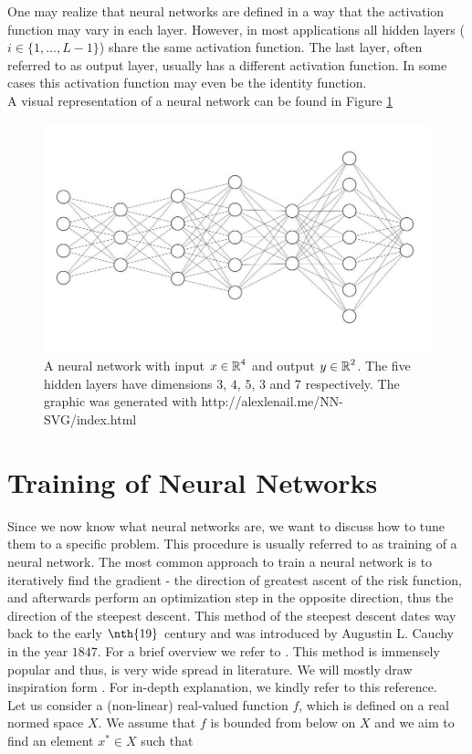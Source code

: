 One may realize that neural networks are defined in a way that the activation function may vary in each layer. However, in most applications all hidden layers ($i \in \{1, \ldots, L-1\}$) share the same activation function. The last layer, often referred to as output layer, usually has a different activation function. In some cases this activation function may even be the identity function.\\
A visual representation of a neural network can be found in Figure \ref{img_nn}


\begin{figure}[H]
\begin{center}
   \begin{minipage}[b]{0.9\linewidth}
      \includegraphics[width=\linewidth]{neural_net}
      \caption{A neural network with input $x\in \operatorname{\mathbb{R}}^4$ and output $y\in\operatorname{\mathbb{R}}^2$. The five hidden layers have dimensions $3$, $4$, $5$, $3$ and $7$ respectively. The graphic was generated with http://alexlenail.me/NN-SVG/index.html}\label{img_nn}
	\end{minipage}
\end{center}
\end{figure}


\section{Training of Neural Networks}\label{sec:training_of_nn}
Since we now know what neural networks are, we want to discuss how to tune them to a specific problem. This procedure is usually referred to as training of a neural network. The most common approach to train a neural network is to iteratively find the gradient - the direction of greatest ascent of the risk function, and afterwards perform an optimization step in the opposite direction, thus the direction of the steepest descent. This method of the steepest descent dates way back to the early $\nth{19}$ century and was introduced by Augustin L. Cauchy in the year $1847$. For a brief overview we refer to \cite{lemarechal2012cauchy}. This method is immensely popular and thus, is very wide spread in literature. We will mostly draw inspiration form \cite[Chapter~XV]{kantorovich2016functional}. For in-depth explanation, we kindly refer to this reference.\\
Let us consider a (non-linear) real-valued function $f$, which is defined on a real normed space $X$. We assume that $f$ is bounded from below on $X$ and we aim to find an element $x^{\ast}\in X$ such that

